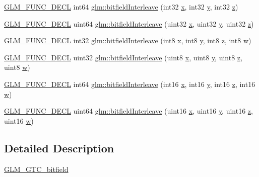 \begin{DoxyCompactItemize}
\item 
\hyperlink{setup_8hpp_ab2d052de21a70539923e9bcbf6e83a51}{G\+L\+M\+\_\+\+F\+U\+N\+C\+\_\+\+D\+E\+CL} int64 \hyperlink{group__gtc__bitfield_ga64e2d84f6560af3cc639644b1e628c42}{glm\+::bitfield\+Interleave} (int32 \hyperlink{_s_d_l__opengl_8h_ad0e63d0edcdbd3d79554076bf309fd47}{x}, int32 \hyperlink{_s_d_l__opengl_8h_a1675d9d7bb68e1657ff028643b4037e3}{y}, int32 \hyperlink{_s_d_l__opengl__glext_8h_a5e74030ebb3297ce1b37ff716fedd68f}{z})
\item 
\hyperlink{setup_8hpp_ab2d052de21a70539923e9bcbf6e83a51}{G\+L\+M\+\_\+\+F\+U\+N\+C\+\_\+\+D\+E\+CL} uint64 \hyperlink{group__gtc__bitfield_ga7c10eb37f608365cfaef5ca2c476e1ce}{glm\+::bitfield\+Interleave} (uint32 \hyperlink{_s_d_l__opengl_8h_ad0e63d0edcdbd3d79554076bf309fd47}{x}, uint32 \hyperlink{_s_d_l__opengl_8h_a1675d9d7bb68e1657ff028643b4037e3}{y}, uint32 \hyperlink{_s_d_l__opengl__glext_8h_a5e74030ebb3297ce1b37ff716fedd68f}{z})
\item 
\hyperlink{setup_8hpp_ab2d052de21a70539923e9bcbf6e83a51}{G\+L\+M\+\_\+\+F\+U\+N\+C\+\_\+\+D\+E\+CL} int32 \hyperlink{group__gtc__bitfield_ga7da84ecc2b3a46c9c08a9f40012359cf}{glm\+::bitfield\+Interleave} (int8 \hyperlink{_s_d_l__opengl_8h_ad0e63d0edcdbd3d79554076bf309fd47}{x}, int8 \hyperlink{_s_d_l__opengl_8h_a1675d9d7bb68e1657ff028643b4037e3}{y}, int8 \hyperlink{_s_d_l__opengl__glext_8h_a5e74030ebb3297ce1b37ff716fedd68f}{z}, int8 \hyperlink{_s_d_l__opengl__glext_8h_a6ee8f168a7ab6785a9bb57c6715dad99}{w})
\item 
\hyperlink{setup_8hpp_ab2d052de21a70539923e9bcbf6e83a51}{G\+L\+M\+\_\+\+F\+U\+N\+C\+\_\+\+D\+E\+CL} uint32 \hyperlink{group__gtc__bitfield_ga447c0bbed9d60c14578626d8f03f3755}{glm\+::bitfield\+Interleave} (uint8 \hyperlink{_s_d_l__opengl_8h_ad0e63d0edcdbd3d79554076bf309fd47}{x}, uint8 \hyperlink{_s_d_l__opengl_8h_a1675d9d7bb68e1657ff028643b4037e3}{y}, uint8 \hyperlink{_s_d_l__opengl__glext_8h_a5e74030ebb3297ce1b37ff716fedd68f}{z}, uint8 \hyperlink{_s_d_l__opengl__glext_8h_a6ee8f168a7ab6785a9bb57c6715dad99}{w})
\item 
\hyperlink{setup_8hpp_ab2d052de21a70539923e9bcbf6e83a51}{G\+L\+M\+\_\+\+F\+U\+N\+C\+\_\+\+D\+E\+CL} int64 \hyperlink{group__gtc__bitfield_ga09ee0be0fac790a1607a711e597dd9bf}{glm\+::bitfield\+Interleave} (int16 \hyperlink{_s_d_l__opengl_8h_ad0e63d0edcdbd3d79554076bf309fd47}{x}, int16 \hyperlink{_s_d_l__opengl_8h_a1675d9d7bb68e1657ff028643b4037e3}{y}, int16 \hyperlink{_s_d_l__opengl__glext_8h_a5e74030ebb3297ce1b37ff716fedd68f}{z}, int16 \hyperlink{_s_d_l__opengl__glext_8h_a6ee8f168a7ab6785a9bb57c6715dad99}{w})
\item 
\hyperlink{setup_8hpp_ab2d052de21a70539923e9bcbf6e83a51}{G\+L\+M\+\_\+\+F\+U\+N\+C\+\_\+\+D\+E\+CL} uint64 \hyperlink{group__gtc__bitfield_gac8a926a7bfd9b23c22a4f685193fbfe1}{glm\+::bitfield\+Interleave} (uint16 \hyperlink{_s_d_l__opengl_8h_ad0e63d0edcdbd3d79554076bf309fd47}{x}, uint16 \hyperlink{_s_d_l__opengl_8h_a1675d9d7bb68e1657ff028643b4037e3}{y}, uint16 \hyperlink{_s_d_l__opengl__glext_8h_a5e74030ebb3297ce1b37ff716fedd68f}{z}, uint16 \hyperlink{_s_d_l__opengl__glext_8h_a6ee8f168a7ab6785a9bb57c6715dad99}{w})
\end{DoxyCompactItemize}


\subsection{Detailed Description}
\hyperlink{group__gtc__bitfield}{G\+L\+M\+\_\+\+G\+T\+C\+\_\+bitfield} 